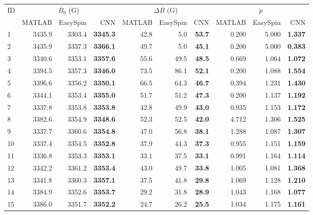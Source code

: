 \documentclass[a4paper,11pt]{article}
\begin{document}
\begin{longtable}{l rrr rrr rrr}
\toprule
ID & \multicolumn{3}{c}{$B_0$ (G)} & \multicolumn{3}{c}{$\Delta B$ (G)} & \multicolumn{3}{c}{$p$} \\
\cmidrule(lr){2-4} \cmidrule(lr){5-7} \cmidrule(lr){8-10}
 & MATLAB & EasySpin & CNN & MATLAB & EasySpin & CNN & MATLAB & EasySpin & CNN \\
\midrule
\endhead
  1 & 3435.9 & 3303.4 & \textbf{3345.3} & 42.8 & 5.0 & \textbf{53.7} & 0.200 & 5.000 & \textbf{1.337} \\
  2 & 3435.9 & 3337.3 & \textbf{3366.1} & 49.7 & 5.0 & \textbf{45.1} & 0.200 & 5.000 & \textbf{0.383} \\
  3 & 3340.6 & 3353.1 & \textbf{3357.6} & 55.6 & 49.5 & \textbf{48.5} & 0.669 & 1.064 & \textbf{1.072} \\
  4 & 3394.5 & 3357.3 & \textbf{3346.0} & 73.5 & 86.1 & \textbf{52.1} & 0.200 & 1.088 & \textbf{1.554} \\
  5 & 3396.6 & 3356.2 & \textbf{3350.1} & 66.5 & 64.3 & \textbf{46.7} & 0.394 & 1.231 & \textbf{1.430} \\
  6 & 3344.1 & 3353.4 & \textbf{3355.0} & 51.7 & 51.2 & \textbf{47.3} & 0.200 & 1.137 & \textbf{1.192} \\
  7 & 3337.8 & 3353.8 & \textbf{3353.8} & 42.8 & 49.9 & \textbf{43.0} & 0.935 & 1.153 & \textbf{1.172} \\
  8 & 3382.6 & 3354.9 & \textbf{3348.6} & 52.3 & 52.5 & \textbf{42.0} & 4.712 & 1.306 & \textbf{1.525} \\
  9 & 3337.7 & 3360.6 & \textbf{3354.8} & 47.0 & 56.8 & \textbf{38.1} & 1.288 & 1.087 & \textbf{1.307} \\
  10 & 3337.4 & 3354.5 & \textbf{3352.8} & 37.9 & 44.3 & \textbf{37.3} & 0.955 & 1.151 & \textbf{1.159} \\
  11 & 3336.8 & 3353.3 & \textbf{3353.1} & 33.1 & 37.5 & \textbf{33.1} & 0.991 & 1.164 & \textbf{1.114} \\
  12 & 3342.2 & 3361.2 & \textbf{3353.4} & 43.0 & 49.7 & \textbf{33.8} & 1.005 & 1.081 & \textbf{1.368} \\
  13 & 3341.8 & 3360.3 & \textbf{3357.1} & 37.5 & 41.8 & \textbf{29.8} & 1.069 & 1.128 & \textbf{1.210} \\
  14 & 3384.9 & 3352.6 & \textbf{3353.7} & 29.2 & 31.8 & \textbf{28.9} & 1.043 & 1.168 & \textbf{1.077} \\
  15 & 3386.0 & 3351.7 & \textbf{3352.2} & 24.7 & 26.2 & \textbf{25.5} & 1.034 & 1.175 & \textbf{1.161} \\

\end{longtable}
\end{document}
